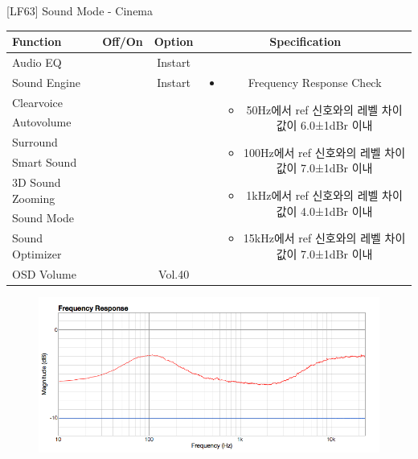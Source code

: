 \begin{frame}[t]{[LF63] Sound Mode - Cinema}
\begin{tiny}
\begin{tabular}{@{}lccc@{}}
\toprule
Function & Off/On & Option & Specification \\
\midrule
Audio EQ & \color{black}{Off} & Instart &
\multirow{10}{60mm}{
\begin{itemize}
\item Frequency Response Check
	\begin{itemize}
	\item 50Hz에서 ref 신호와의 레벨 차이값이 6.0±1dBr 이내
	\item 100Hz에서 ref 신호와의 레벨 차이값이 7.0±1dBr 이내
	\item 1kHz에서 ref 신호와의 레벨 차이값이 4.0±1dBr 이내
	\item 15kHz에서 ref 신호와의 레벨 차이값이 7.0±1dBr 이내
	\end{itemize}
\end{itemize}
} \\
Sound Engine & \color{blue}{On} & Instart & \\
Clearvoice & \color{black}{Off} & & \\
Autovolume & \color{black}{Off} & & \\
Surround & \color{black}{Off} & & \\
Smart Sound & \color{black}{Off} & & \\
3D Sound Zooming & \color{black}{Off} & & \\
Sound Mode & \color{blue}{On} & \color{blue}{Cinema} & \\
Sound Optimizer & \color{black}{Off} & & \\
OSD Volume & \color{blue}{On} & Vol.40 & \\
\midrule
\end{tabular}
\end{tiny}

\begin{figure}[b]
\includegraphics[height=0.4\textwidth]{figures/cinema.png}
\end{figure}

\end{frame}
